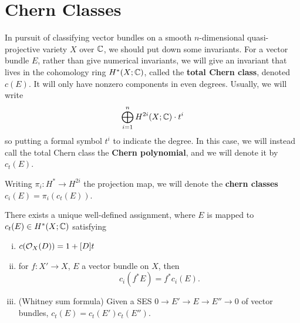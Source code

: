 \documentclass[12pt]{article}
\begin{document}
\section{Chern Classes}

In pursuit of classifying vector bundles on a smooth $n$-dimensional quasi-projective variety $X$ over $\mathbb{C}$, we should put down some invariants. For a vector bundle $E$, rather than give numerical invariants, we will give an invariant that lives in the cohomology ring $H^*(X;\mathbb{C})$, called the \textbf{total Chern class}, denoted $c(E)$. It will only have nonzero components in even degrees. Usually, we will write
\[\bigoplus_{i=1}^{n} H^{2i}(X;\mathbb{C}) \cdot t^i\]
so putting a formal symbol $t^i$ to indicate the degree. In this case, we will instead call the total Chern class the \textbf{Chern polynomial}, and we will denote it by $c_t(E)$.

Writing $\pi_i:H^* \to H^{2i}$ the projection map, we will denote the \textbf{chern classes} $c_i(E) = \pi_i(c_t(E))$.

\begin{prop}
    There exists a unique well-defined assignment, where $E$ is mapped to $c_t(E) \in H^*(X;\mathbb{C})$ satisfying
    \begin{enumerate}[(i)]
        \item $c(\mathcal{O}_X(D)) = 1+[D]t$
        \item for $f:X'\to X$, $E$ a vector bundle on $X$, then
        \[c_i(f^* E) = f^*c_i(E).\]
        \item (Whitney sum formula) Given a SES $0\to E' \to E \to E'' \to 0$ of vector bundles, $c_t(E)=c_t(E') c_t(E'')$.
    \end{enumerate}
\end{prop}
\end{document}
